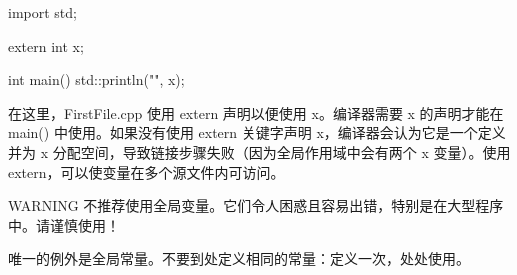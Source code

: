 \begin{cpp}
import std;

extern int x;

int main()
{
    std::println("{}", x);
}
\end{cpp}

在这里，FirstFile.cpp 使用 extern 声明以便使用 x。编译器需要 x 的声明才能在 main() 中使用。如果没有使用 extern 关键字声明 x，编译器会认为它是一个定义并为 x 分配空间，导致链接步骤失败（因为全局作用域中会有两个 x 变量）。使用 extern，可以使变量在多个源文件内可访问。

\begin{myWarning}{WARNING}
不推荐使用全局变量。它们令人困惑且容易出错，特别是在大型程序中。请谨慎使用！

唯一的例外是全局常量。不要到处定义相同的常量：定义一次，处处使用。
\end{myWarning}




